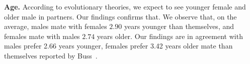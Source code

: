 \documentclass[journal,comsoc]{IEEEtran}
\newcommand{\hbIdea}[1]{{\color{red}{\scriptsize [{#1}]}}}
\begin{document}
\hbIdea{age} %
\textbf{Age.}
According to evolutionary theories,
we expect to see younger female and older male in partners.
Our findings confirms that.
We observe that,
on the average, 
males mate with females $2.90$ years younger than themselves,
and
females mate with males $2.74$ years older.
Our findings are in agreement with 
males prefer 2.66 years younger, 
females prefer 3.42 years older mate than themselves reported by Buss~\cite{
	Buss1989}.
%




%

\end{document}
